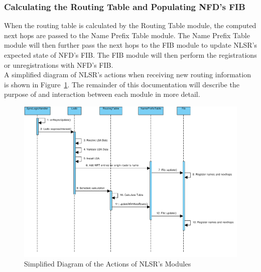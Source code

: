 \subsubsection{Calculating the Routing Table and Populating NFD's FIB}

When the routing table is calculated by the Routing Table module, the computed next hops are passed to the Name Prefix Table module.
The Name Prefix Table module will then further pass the next hops to the FIB module to update NLSR's expected state of NFD's FIB.
The FIB module will then perform the registrations or unregistrations with NFD's FIB.\\

A simplified diagram of NLSR's actions when receiving new routing information is shown in Figure~\ref{fig:system-interaction}.
The remainder of this documentation will describe the purpose of and interaction between each module in more detail.

\begin{figure}
\center
\includegraphics[width=\linewidth]{figures/system-interaction}
\caption{Simplified Diagram of the Actions of NLSR's Modules}
\label{fig:system-interaction}
\end{figure}

